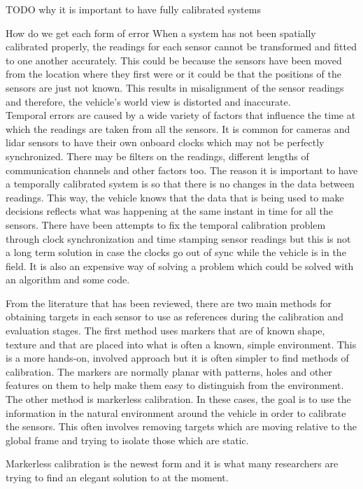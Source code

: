 
TODO why it is important to have fully calibrated systems



How do we get each form of error
When a system has not been spatially calibrated properly, the readings for each sensor cannot be transformed and fitted to one another accurately. This could be because the sensors have been moved from the location where they first were or it could be that the positions of the sensors are just not known. This results in misalignment of the sensor readings and therefore, the vehicle's world view is distorted and inaccurate.\\
Temporal errors are caused by a wide variety of factors that influence the time at which the readings are taken from all the sensors. It is common for cameras and lidar sensors to have their own onboard clocks which may not be perfectly synchronized. There may be filters on the readings, different lengths of communication channels and other factors too. The reason it is important to have a temporally calibrated system is so that there is no changes in the data between readings. This way, the vehicle knows that the data that is being used to make decisions reflects what was happening at the same instant in time for all the sensors. 
There have been attempts to fix the temporal calibration problem through clock synchronization and time stamping sensor readings but this is not a long term solution in case the clocks go out of sync while the vehicle is in the field. It is also an expensive way of solving a problem which could be solved with an algorithm and some code. 


From the literature that has been reviewed, there are two main methods for obtaining targets in each sensor to use as references during the calibration and evaluation stages. The first method uses markers that are of known shape, texture and that are placed into what is often a known, simple environment. This is a more hands-on, involved approach but it is often simpler to find methods of calibration. The markers are normally planar with patterns, holes and other features on them to help make them easy to distinguish from the environment.
The other method is markerless calibration. In these cases, the goal is to use the information in the natural environment around the vehicle in order to calibrate the sensors. This often involves removing targets which are moving relative to the global frame and trying to isolate those which are static. 

Markerless calibration is the newest form and it is what many researchers are trying to find an elegant solution to at the moment. 



